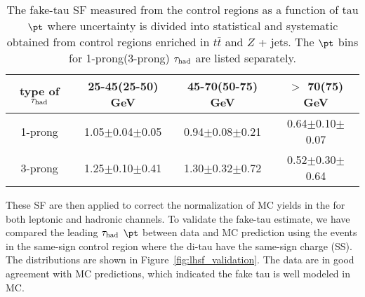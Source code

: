\begin{table}[htb]
\caption{ The fake-tau SF measured from the control regions as a function of tau $\pt$ where uncertainty is divided into statistical and 
systematic obtained from control regions enriched in $t\bar t$ and $Z$ + jets. The $\pt$ bins for 1-prong(3-prong) $\tau_\text{had}$ are listed separately.}
\centering
\begin{tabular}{|c|c|c|c|} \hline
type of $\tau_\text{had}$  & 25-45(25-50) GeV & 45-70(50-75) GeV  & $>$ 70(75) GeV \\ \hline
1-prong & 1.05$\pm$0.04$\pm$0.05 & 0.94$\pm$0.08$\pm$0.21 & 0.64$\pm$0.10$\pm$0.07 \\
3-prong & 1.25$\pm$0.10$\pm$0.41 & 1.30$\pm$0.32$\pm$0.72 & 0.52$\pm$0.30$\pm$0.64 \\ \hline
\end{tabular}
\label{tab:faketauSF}
\end{table}

These SF are then applied to correct the normalization of MC yields in the for both leptonic and hadronic channels. 
To validate the fake-tau estimate, we have compared the leading $\tau_\text{had}$ $\pt$ between data and MC prediction using the events in 
the same-sign control region where the di-tau have the same-sign charge (SS).
The distributions are shown in Figure~\ref{fig:lhsf_validation}. The data are in good agreement with MC predictions, 
which indicated the fake tau is well modeled in MC. 

